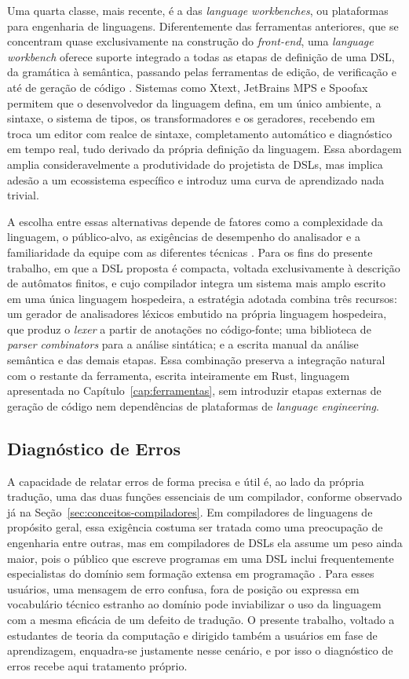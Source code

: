 \documentclass[
    12pt
    ,oneside
    ,a4paper
    ,chapter=TITLE
    ,section=TITLE
    ,sumario=abnt-6027-2012]{abntex2}
\begin{document}
Uma quarta classe, mais recente, é a das \textit{language workbenches}, ou plataformas
para engenharia de linguagens. Diferentemente das ferramentas anteriores, que se concentram
quase exclusivamente na construção do \textit{front-end}, uma \textit{language workbench}
oferece suporte integrado a todas as etapas de definição de uma DSL, da gramática à semântica,
passando pelas ferramentas de edição, de verificação e até de geração de código
\cite{fowler2010}. Sistemas como Xtext, JetBrains MPS e Spoofax permitem que o desenvolvedor da
linguagem defina, em um único ambiente, a sintaxe, o sistema de tipos, os transformadores e os
geradores, recebendo em troca um editor com realce de sintaxe, completamento automático e
diagnóstico em tempo real, tudo derivado da própria definição da linguagem. Essa abordagem
amplia consideravelmente a produtividade do projetista de DSLs, mas implica adesão a um
ecossistema específico e introduz uma curva de aprendizado nada trivial.

A escolha entre essas alternativas depende de fatores como a complexidade da linguagem, o
público-alvo, as exigências de desempenho do analisador e a familiaridade da equipe com as
diferentes técnicas \cite{fowler2010}. Para os fins do presente trabalho, em que a DSL proposta
é compacta, voltada exclusivamente à descrição de autômatos finitos, e cujo compilador integra
um sistema mais amplo escrito em uma única linguagem hospedeira, a estratégia adotada
combina três recursos: um gerador de analisadores léxicos embutido na própria linguagem
hospedeira, que produz o \textit{lexer} a partir de anotações no código-fonte; uma biblioteca
de \textit{parser combinators} para a análise sintática; e a escrita manual da análise
semântica e das demais etapas. Essa combinação preserva a integração natural com o restante da
ferramenta, escrita inteiramente em Rust, linguagem apresentada no Capítulo~\ref{cap:ferramentas},
sem introduzir etapas externas de
geração de código nem dependências de plataformas de \textit{language engineering}.

\subsection{Diagnóstico de Erros}
\label{sec:diagnostico-erro}

A capacidade de relatar erros de forma precisa e útil é, ao lado da própria tradução, uma das
duas funções essenciais de um compilador, conforme observado já na Seção~\ref{sec:conceitos-compiladores}.
Em compiladores de linguagens de propósito geral, essa exigência costuma ser tratada como uma
preocupação de engenharia entre outras, mas em compiladores de DSLs ela assume um peso ainda
maior, pois o público que escreve programas em uma DSL inclui frequentemente especialistas do
domínio sem formação extensa em programação \cite{fowler2010}. Para esses usuários, uma mensagem
de erro confusa, fora de posição ou expressa em vocabulário técnico estranho ao domínio pode
inviabilizar o uso da linguagem com a mesma eficácia de um defeito de tradução. O presente
trabalho, voltado a estudantes de teoria da computação e dirigido também a usuários em fase de
aprendizagem, enquadra-se justamente nesse cenário, e por isso o diagnóstico de erros recebe
aqui tratamento próprio.
\end{document}
